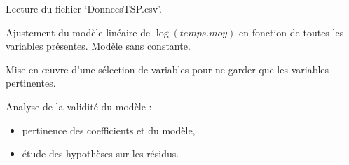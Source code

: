 \documentclass[
]{article}
\begin{document}
Lecture du fichier `DonneesTSP.csv'.

Ajustement du modèle linéaire de \(\log(temps.moy)\) en fonction de
toutes les variables présentes. Modèle sans constante.

Mise en \oe uvre d'une sélection de variables pour ne garder que les
variables pertinentes.

Analyse de la validité du modèle :

\begin{itemize}
\item
  pertinence des coefficients et du modèle,
\item
  étude des hypothèses sur les résidus.
\end{itemize}
\end{document}
